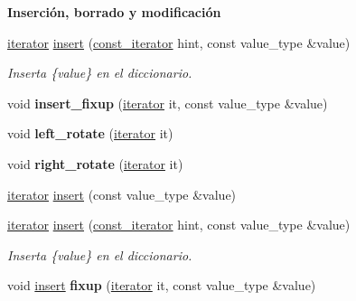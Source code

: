 \begin{Indent}{\bf \-Inserción, borrado y modificación}\par
\begin{DoxyCompactItemize}
\item 
\hyperlink{classaed2_1_1map_1_1iterator}{iterator} \hyperlink{classaed2_1_1map_a6941cde9a79c27f054b5c97a587a1854}{insert} (\hyperlink{classaed2_1_1map_1_1const__iterator}{const\-\_\-iterator} hint, const value\-\_\-type \&value)
\begin{DoxyCompactList}\small\item\em \-Inserta \{value\} en el diccionario. \end{DoxyCompactList}\item 
\hypertarget{classaed2_1_1map_a71e3ecf911958188e1e2fd7d76b2b1e9}{void {\bfseries insert\-\_\-fixup} (\hyperlink{classaed2_1_1map_1_1iterator}{iterator} it, const value\-\_\-type \&value)}\label{classaed2_1_1map_a71e3ecf911958188e1e2fd7d76b2b1e9}

\item 
\hypertarget{classaed2_1_1map_a1f4b383ece3e22680802d27aa11b623a}{void {\bfseries left\-\_\-rotate} (\hyperlink{classaed2_1_1map_1_1iterator}{iterator} it)}\label{classaed2_1_1map_a1f4b383ece3e22680802d27aa11b623a}

\item 
\hypertarget{classaed2_1_1map_af339eb8e0af78bc07ad55ddd97938ee7}{void {\bfseries right\-\_\-rotate} (\hyperlink{classaed2_1_1map_1_1iterator}{iterator} it)}\label{classaed2_1_1map_af339eb8e0af78bc07ad55ddd97938ee7}

\item 
\hyperlink{classaed2_1_1map_1_1iterator}{iterator} \hyperlink{classaed2_1_1map_a60aacba06b1579630b3c8e996cf248c8}{insert} (const value\-\_\-type \&value)
\item 
\hyperlink{classaed2_1_1map_1_1iterator}{iterator} \hyperlink{classaed2_1_1map_a6941cde9a79c27f054b5c97a587a1854}{insert} (\hyperlink{classaed2_1_1map_1_1const__iterator}{const\-\_\-iterator} hint, const value\-\_\-type \&value)
\begin{DoxyCompactList}\small\item\em \-Inserta \{value\} en el diccionario. \end{DoxyCompactList}\item 
\hypertarget{classaed2_1_1map_a905aa80287bf2a97cca5a9dda1c8ab12}{void \hyperlink{classaed2_1_1map_a6941cde9a79c27f054b5c97a587a1854}{insert} {\bfseries fixup} (\hyperlink{classaed2_1_1map_1_1iterator}{iterator} it, const value\-\_\-type \&value)}\label{classaed2_1_1map_a905aa80287bf2a97cca5a9dda1c8ab12}


\end{DoxyCompactItemize}
\end{Indent}
